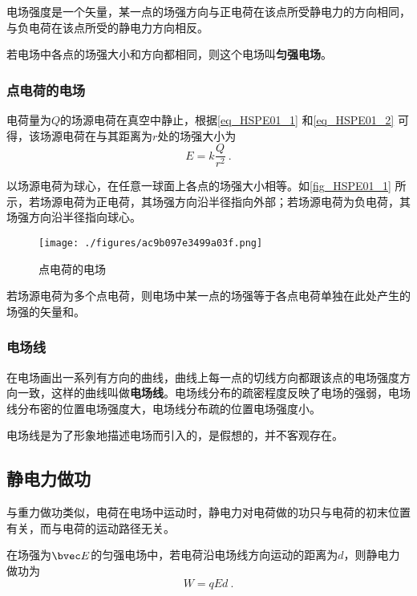 电场强度是一个矢量，某一点的场强方向与正电荷在该点所受静电力的方向相同，与负电荷在该点所受的静电力方向相反。

若电场中各点的场强大小和方向都相同，则这个电场叫\textbf{匀强电场}。

\subsubsection{点电荷的电场}

电荷量为$Q$的场源电荷在真空中静止，根据\autoref{eq_HSPE01_1} 和\autoref{eq_HSPE01_2} 可得，该场源电荷在与其距离为$r$处的场强大小为
\begin{equation}
E=k\frac{Q}{r^2}~.
\end{equation}

以场源电荷为球心，在任意一球面上各点的场强大小相等。如\autoref{fig_HSPE01_1} 所示，若场源电荷为正电荷，其场强方向沿半径指向外部；若场源电荷为负电荷，其场强方向沿半径指向球心。

\begin{figure}[ht]
\centering
\texttt{[image: ./figures/ac9b097e3499a03f.png]}
\caption{点电荷的电场} \label{fig_HSPE01_1}
\end{figure}

若场源电荷为多个点电荷，则电场中某一点的场强等于各点电荷单独在此处产生的场强的矢量和。

\subsubsection{电场线}

在电场画出一系列有方向的曲线，曲线上每一点的切线方向都跟该点的电场强度方向一致，这样的曲线叫做\textbf{电场线}。电场线分布的疏密程度反映了电场的强弱，电场线分布密的位置电场强度大，电场线分布疏的位置电场强度小。

电场线是为了形象地描述电场而引入的，是假想的，并不客观存在。

\subsection{静电力做功}

与重力做功类似，电荷在电场中运动时，静电力对电荷做的功只与电荷的初末位置有关，而与电荷的运动路径无关。

在场强为$\bvec E$的匀强电场中，若电荷沿电场线方向运动的距离为$d$，则静电力做功为
\begin{equation}\label{eq_HSPE01_5}
W=qEd~.
\end{equation}


